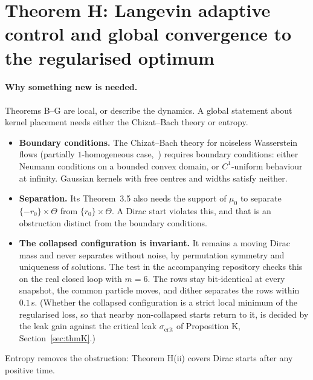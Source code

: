\section{Theorem H: Langevin adaptive control and global convergence to the regularised optimum}\label{sec:thmH}

\paragraph{Why something new is needed.}
Theorems B--G are local, or describe the dynamics. A global statement about kernel placement needs either the
Chizat--Bach theory or entropy.
\begin{itemize}
  \item \textbf{Boundary conditions.} The Chizat--Bach theory for noiseless Wasserstein flows (partially
  $1$-homogeneous case,~\cite{R29}) requires boundary conditions: either Neumann conditions on a bounded convex domain,
  or $C^1$-uniform behaviour at infinity. Gaussian kernels with free centres and widths satisfy neither.
  \item \textbf{Separation.} Its Theorem~3.5 also needs the support of $\mu_0$ to separate $\{-r_0\}\times\Theta$ from
  $\{r_0\}\times\Theta$. A Dirac start violates this, and that is an obstruction distinct from the boundary
  conditions.
  \item \textbf{The collapsed configuration is invariant.} It remains a moving Dirac mass and never separates without
  noise, by permutation symmetry and uniqueness of solutions. The test
   in the accompanying repository checks
  this on the real closed loop with $m = 6$. The rows stay bit-identical at every snapshot, the common particle moves,
  and dither separates the rows within $0.1$\,s. (Whether the collapsed configuration is a strict local minimum of the
  regularised loss, so that nearby non-collapsed starts return to it, is decided by the leak gain against the
  critical leak $\sigma_{\mathrm{crit}}$ of Proposition K, Section~\ref{sec:thmK}.)
\end{itemize}
Entropy removes the obstruction: Theorem H(ii) covers Dirac starts after any positive time.

